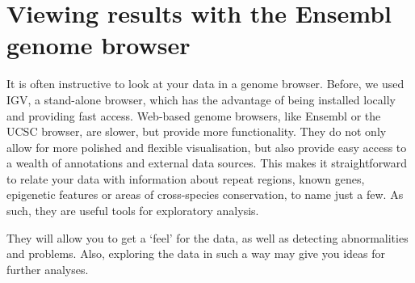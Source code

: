 \section{Viewing results with the Ensembl genome browser}

\begin{information}
It is often instructive to look at your data in a genome browser. Before, we
used IGV, a stand-alone browser, which has the advantage of being installed
locally and providing fast access. Web-based genome browsers, like Ensembl or
the UCSC browser, are slower, but provide more functionality. They do not only
allow for more polished and flexible visualisation, but also provide easy access
to a wealth of annotations and external data sources. This makes it
straightforward to relate your data with information about repeat regions, known
genes, epigenetic features or areas of cross-species conservation, to name just
a few. As such, they are useful tools for exploratory analysis.

They will allow you to get a `feel' for the data, as well as detecting
abnormalities and problems. Also, exploring the data in such a way may give you
ideas for further analyses.
\end{information}


